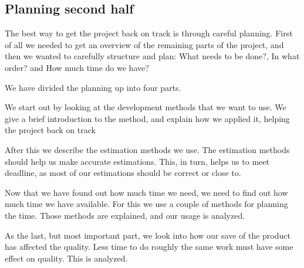 \subsection{Planning second half}
The best way to get the project back on track is through careful planning. First of all we needed to get an overview of the remaining parts of the project, and then we wanted to carefully structure and plan: What needs to be done?, In what order? and How much time do we have?

We have divided the planning up into four parts.

We start out by looking at the development methods that we want to use. We give a brief introduction to the method, and explain how we applied it, helping the project back on track

After this we describe the estimation methods we use. The estimation methods should help us make accurate estimations. This, in turn, helps us to meet deadline, as most of our estimations should be correct or close to.

Now that we have found out how much time we need, we need to find out how much time we have available. For this we use a couple of methods for planning the time. Those methods are explained, and our usage is analyzed.

As the last, but most important part, we look into how our save of the product has affected the quality. Less time to do roughly the same work must have some effect on quality. This is analyzed.